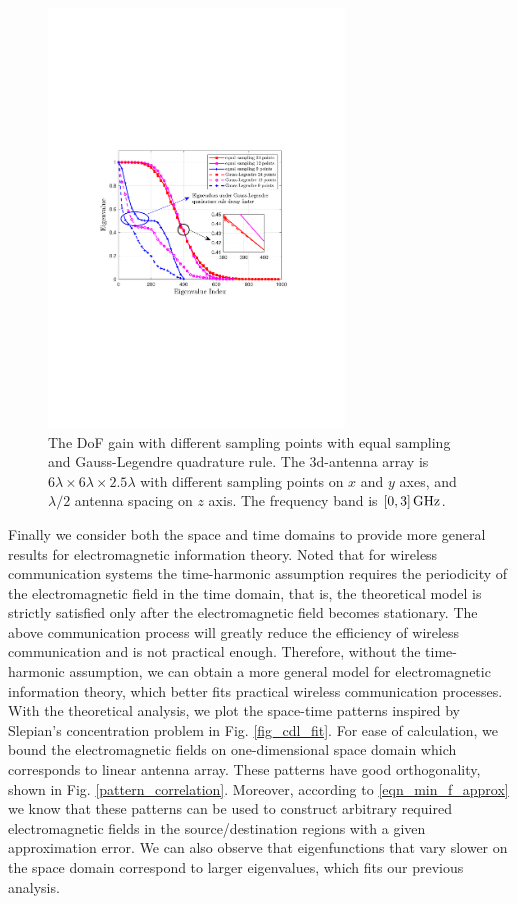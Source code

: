 \documentclass[12pt,draftclsnofoot,journal,onecolumn]{IEEEtran}
\begin{document}
\begin{figure}
	\centering 
	\includegraphics[width=0.7\textwidth]{figs/different_sampling_scheme_merge.pdf} 
	\caption{The DoF gain with different sampling points with equal sampling and Gauss-Legendre quadrature rule. The 3d-antenna array is $6\lambda \times 6\lambda \times 2.5\lambda$ with different sampling points on $x$ and $y$ axes, and $\lambda/2$ antenna spacing on $z$ axis. The frequency band is $[0,3]\,{\rm GHz}$.} 
	\label{different_sampling_scheme_merge}
\end{figure}

Finally we consider both the space and time domains to provide more general results for electromagnetic information theory. Noted that for wireless communication systems the time-harmonic assumption requires the periodicity of the electromagnetic field in the time domain, that is, the theoretical model is strictly satisfied only after the electromagnetic field becomes stationary. The above communication process will greatly reduce the efficiency of wireless communication and is not practical enough. Therefore, without the time-harmonic assumption, we can obtain a more general model for electromagnetic information theory, which better fits practical wireless communication processes. With the theoretical analysis, we plot the space-time patterns inspired by Slepian's concentration problem in Fig. \ref{fig_cdl_fit}. For ease of calculation, we bound the electromagnetic fields on one-dimensional space domain which corresponds to linear antenna array. These patterns have good orthogonality, shown in Fig. \ref{pattern_correlation}. Moreover, according to \eqref{eqn_min_f_approx} we know that these patterns can be used to construct arbitrary required electromagnetic fields in the source/destination regions with a given approximation error. {\color{red} We can also observe that eigenfunctions that vary slower on the space domain correspond to larger eigenvalues, which fits our previous analysis.}
\end{document}

